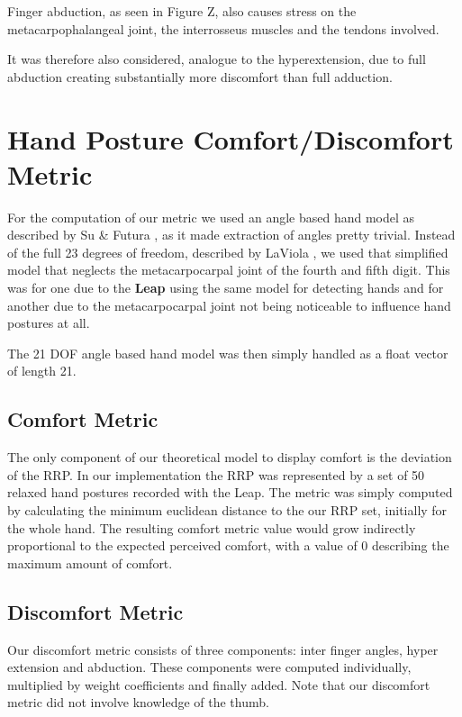 \documentclass{sig-alternate-05-2015}
\begin{document}
Finger abduction, as seen in Figure Z,
also causes stress on the metacarpophalangeal joint, the interrosseus muscles and the tendons involved.

It was therefore also considered, analogue to the hyperextension, due to full abduction creating substantially more discomfort than full adduction.


\section{Hand Posture Comfort/Discomfort Metric}
For the computation of our metric we used an angle based hand model as described by Su \& Futura \cite{su1994logical}, as it made extraction of angles pretty trivial. Instead of the full 23 degrees of freedom, described by LaViola \cite{laviola1999survey}, we used that simplified model that neglects the metacarpocarpal joint of the fourth and fifth digit. This was for one due to the \textbf{Leap} using the same model for detecting hands and for another due to the metacarpocarpal joint not being noticeable to influence hand postures at all.

The 21 DOF angle based hand model was then simply handled as a float vector of length 21. 

\subsection{Comfort Metric}

The only component of our theoretical model to display comfort is the deviation of the RRP. In our implementation the RRP was represented by a set of 50 relaxed hand postures recorded with the Leap. The metric was simply computed by calculating the minimum euclidean distance to the our RRP set, initially for the whole hand.
The resulting comfort metric value would grow indirectly proportional to the expected perceived comfort, with a value of 0 describing the maximum amount of comfort. 


\subsection{Discomfort Metric}

Our discomfort metric consists of three components: inter finger angles, hyper extension and abduction. These components were computed individually, multiplied by weight coefficients and finally added. Note that our discomfort metric did not involve knowledge of the thumb.
\end{document}
